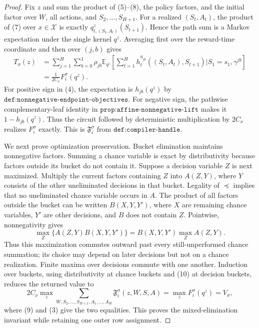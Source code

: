 \documentclass{article}
\begin{document}
\begin{proof}
Fix \(z\) and sum the product of (5)--(8), the policy factors, and the initial factor over \(W\), all actions, and \(S_2,\ldots,S_{H+1}\).  For a realized \((S_t,A_t)\), the product of (7) over \(x\in\mathcal X\) is exactly \(q^z_{t,(S_t,A_t)}(S_{t+1})\).  Hence the path sum is a Markov expectation under the single kernel \(q^z\).  Averaging first over the reward-time coordinate and then over \((j,b)\) gives
\[
 \begin{aligned}
 T_\sigma(z)
 &=\sum_{j=1}^H\sum_{b=0}^1\rho_{jb}
   \mathbb E_{q^z}\!\left[
    \sum_{t=1}^H h_t^{\eta_{jb}}((S_t,A_t),S_{t+1})
    \mathrel{\big|}S_1=s_1,\gamma^{jb}\right]\\
 &=\frac{1}{2C_\nu}F_i^\sigma(q^z).
 \end{aligned}
 \tag{9}
\]
For positive sign in (4), the expectation is \(h_{jb}(q^z)\) by \(\texttt{def:nonnegative-endpoint-objectives}\).  For negative sign, the pathwise complementary-leaf identity in \(\texttt{prop:affine-nonnegative-lift}\) makes it \(1-h_{jb}(q^z)\).  Thus the circuit followed by deterministic multiplication by \(2C_\nu\) realizes \(F_i^\sigma\) exactly.  This is \(\mathfrak F_i^\sigma\) from \(\texttt{def:compiler-handle}\).

We next prove optimization preservation.  Bucket elimination maintains nonnegative factors.  Summing a chance variable is exact by distributivity because factors outside its bucket do not contain it.  Suppose a decision variable \(Z\) is next maximized.  Multiply the current factors containing \(Z\) into \(A(Z,Y)\), where \(Y\) consists of the other uneliminated decisions in that bucket.  Legality of \(\preceq\) implies that no uneliminated chance variable occurs in \(A\).  The product of all factors outside the bucket can be written \(B(X,Y,Y')\), where \(X\) are remaining chance variables, \(Y'\) are other decisions, and \(B\) does not contain \(Z\).  Pointwise, nonnegativity gives
\[
 \max_Z\{A(Z,Y)B(X,Y,Y')\}
 =B(X,Y,Y')\max_ZA(Z,Y).
 \tag{10}
\]
Thus this maximization commutes outward past every still-unperformed chance summation; its choice may depend on later decisions but not on a chance realization.  Finite maxima over decisions commute with one another.  Induction over buckets, using distributivity at chance buckets and (10) at decision buckets, reduces the returned value to
\[
 2C_\nu\max_z\sum_{W,S_2,\ldots,S_{H+1},A_1,\ldots,A_H}
       \mathfrak F_i^\sigma(z,W,S,A)
 =\max_zF_i^\sigma(q^z)=V_\sigma,
 \tag{11}
\]
where (9) and (3) give the two equalities.  This proves the mixed-elimination invariant while retaining one outer row assignment.


\end{proof}
\end{document}
